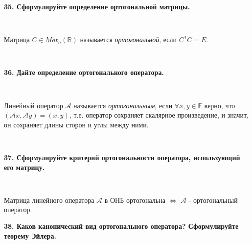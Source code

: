 \documentclass{article}
\begin{document}
    \textbf{35. Сформулируйте определение ортогональной матрицы.}

    {
        $\;$
        \setlength{\parindent}{0.4cm}
        \hangindent=0.4cm

    Матрица $C \in Mat_n(\mathbb{R})$ называется \textit{ортогональной}, если $C^T C = E$.

        $\;$
        \setlength{\parindent}{0cm}
        \hangindent=0cm
    }

    \textbf{36. Дайте определение ортогонального оператора.}

    {
        $\;$
        \setlength{\parindent}{0.4cm}
        \hangindent=0.4cm

    Линейный оператор $\mathcal{A}$ называется \textit{ортогональным}, если $\forall x, y \in \mathbb{E}$ верно, что $(\mathcal{A}x, \mathcal{A}y)= (x, y)$, т.е. оператор сохраняет скалярное произведение, и значит, он сохраняет длины сторон и углы между ними.

        $\;$
        \setlength{\parindent}{0cm}
        \hangindent=0cm
    }


    \textbf{37. Сформулируйте критерий ортогональности оператора, использующий его матрицу.}

    {
        $\;$
        \setlength{\parindent}{0.4cm}
        \hangindent=0.4cm

    Матрица линейного оператора $\mathcal{A}$ в ОНБ ортогональна $\Leftrightarrow$ $\mathcal{A}$ - ортогональный оператор.
        $\;$
        \setlength{\parindent}{0cm}
        \hangindent=0cm
    }

    \textbf{38. Каков канонический вид ортогонального оператора? Сформулируйте теорему Эйлера.}
\end{document}
